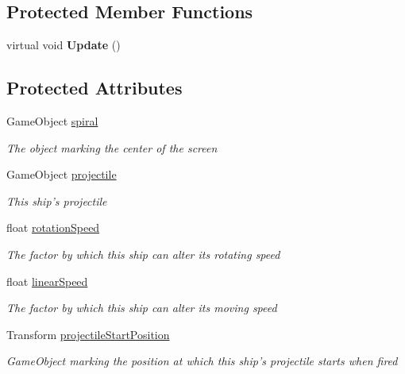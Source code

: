 \subsection*{Protected Member Functions}
\begin{DoxyCompactItemize}
\item 
\hypertarget{class_spaceship_a2be0a354de8e97d2597cf2e39fb21710}{virtual void {\bfseries Update} ()}\label{class_spaceship_a2be0a354de8e97d2597cf2e39fb21710}

\end{DoxyCompactItemize}
\subsection*{Protected Attributes}
\begin{DoxyCompactItemize}
\item 
Game\-Object \hyperlink{class_spaceship_adbf95f3b338830d88ec225679d253ebb}{spiral}
\begin{DoxyCompactList}\small\item\em The object marking the center of the screen \end{DoxyCompactList}\item 
Game\-Object \hyperlink{class_spaceship_aa7814313026fe06a08a7d799e6830b28}{projectile}
\begin{DoxyCompactList}\small\item\em This ship's projectile \end{DoxyCompactList}\item 
float \hyperlink{class_spaceship_ad30837a682fd018a634b8310a121b7b4}{rotation\-Speed}
\begin{DoxyCompactList}\small\item\em The factor by which this ship can alter its rotating speed \end{DoxyCompactList}\item 
float \hyperlink{class_spaceship_ab6ef069fb7cb9ab6f07849ccac8bdc00}{linear\-Speed}
\begin{DoxyCompactList}\small\item\em The factor by which this ship can alter its moving speed \end{DoxyCompactList}\item 
Transform \hyperlink{class_spaceship_a842c5e6d86de86ffadd4175309855bfb}{projectile\-Start\-Position}
\begin{DoxyCompactList}\small\item\em Game\-Object marking the position at which this ship's projectile starts when fired \end{DoxyCompactList}\item 

\end{DoxyCompactItemize}
